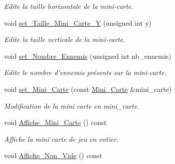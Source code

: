\begin{DoxyCompactItemize}
\begin{DoxyCompactList}\small\item\em Edite la taille horizontale de la mini-\/carte. \end{DoxyCompactList}\item 
\hypertarget{classMini__Carte_ae7b923e190866aa72bbc9e519b97113f}{void \hyperlink{classMini__Carte_ae7b923e190866aa72bbc9e519b97113f}{set\+\_\+\+Taille\+\_\+\+Mini\+\_\+\+Carte\+\_\+\+Y} (unsigned int y)}\label{classMini__Carte_ae7b923e190866aa72bbc9e519b97113f}

\begin{DoxyCompactList}\small\item\em Edite la taille verticale de la mini-\/carte. \end{DoxyCompactList}\item 
\hypertarget{classMini__Carte_aca5011429573ab481e1da9e71f66da5c}{void \hyperlink{classMini__Carte_aca5011429573ab481e1da9e71f66da5c}{set\+\_\+\+Nombre\+\_\+\+Ennemis} (unsigned int nb\+\_\+ennemis)}\label{classMini__Carte_aca5011429573ab481e1da9e71f66da5c}

\begin{DoxyCompactList}\small\item\em Edite le nombre d'ennemis présents sur la mini-\/carte. \end{DoxyCompactList}\item 
\hypertarget{classMini__Carte_a44f5923497dd845749a99e635acc5862}{void \hyperlink{classMini__Carte_a44f5923497dd845749a99e635acc5862}{set\+\_\+\+Mini\+\_\+\+Carte} (const \hyperlink{classMini__Carte}{Mini\+\_\+\+Carte} \&mini\+\_\+carte)}\label{classMini__Carte_a44f5923497dd845749a99e635acc5862}

\begin{DoxyCompactList}\small\item\em Modification de la mini carte en mini\+\_\+carte. \end{DoxyCompactList}\item 
\hypertarget{classMini__Carte_a33143aaed2795104e7f73ae9f3a9186c}{void \hyperlink{classMini__Carte_a33143aaed2795104e7f73ae9f3a9186c}{Affiche\+\_\+\+Mini\+\_\+\+Carte} () const }\label{classMini__Carte_a33143aaed2795104e7f73ae9f3a9186c}

\begin{DoxyCompactList}\small\item\em Affiche la mini carte de jeu en entier. \end{DoxyCompactList}\item 
\hypertarget{classMini__Carte_aef613418e12a631e3512f3d031d9a724}{void \hyperlink{classMini__Carte_aef613418e12a631e3512f3d031d9a724}{Affiche\+\_\+\+Non\+\_\+\+Vide} () const }\label{classMini__Carte_aef613418e12a631e3512f3d031d9a724}


\end{DoxyCompactItemize}
